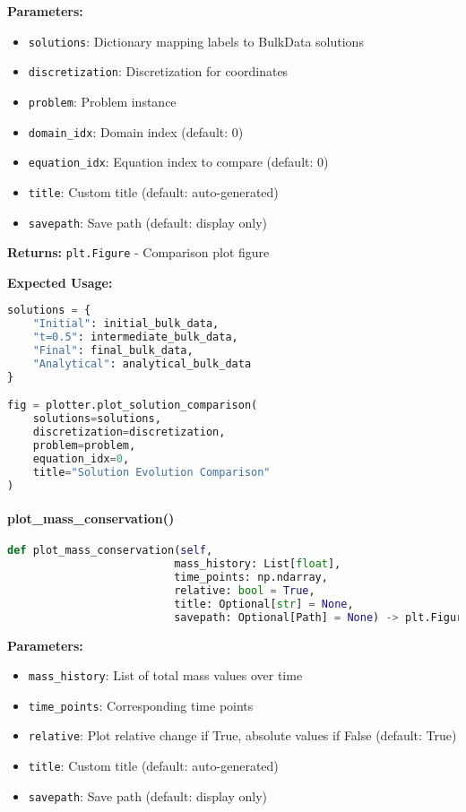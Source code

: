 \textbf{Parameters:}
\begin{itemize}
    \item \texttt{solutions}: Dictionary mapping labels to BulkData solutions
    \item \texttt{discretization}: Discretization for coordinates
    \item \texttt{problem}: Problem instance
    \item \texttt{domain\_idx}: Domain index (default: 0)
    \item \texttt{equation\_idx}: Equation index to compare (default: 0)
    \item \texttt{title}: Custom title (default: auto-generated)
    \item \texttt{savepath}: Save path (default: display only)
\end{itemize}

\textbf{Returns:} \texttt{plt.Figure} - Comparison plot figure

\textbf{Expected Usage:}
\begin{lstlisting}[language=Python, caption=Solution Comparison Usage]
solutions = {
    "Initial": initial_bulk_data,
    "t=0.5": intermediate_bulk_data,
    "Final": final_bulk_data,
    "Analytical": analytical_bulk_data
}

fig = plotter.plot_solution_comparison(
    solutions=solutions,
    discretization=discretization,
    problem=problem,
    equation_idx=0,
    title="Solution Evolution Comparison"
)
\end{lstlisting}

\paragraph{plot\_mass\_conservation()}\leavevmode
\begin{lstlisting}[language=Python, caption=Expected Mass Conservation Plotting Method]
def plot_mass_conservation(self,
                          mass_history: List[float],
                          time_points: np.ndarray,
                          relative: bool = True,
                          title: Optional[str] = None,
                          savepath: Optional[Path] = None) -> plt.Figure
\end{lstlisting}

\textbf{Parameters:}
\begin{itemize}
    \item \texttt{mass\_history}: List of total mass values over time
    \item \texttt{time\_points}: Corresponding time points
    \item \texttt{relative}: Plot relative change if True, absolute values if False (default: True)
    \item \texttt{title}: Custom title (default: auto-generated)
    \item \texttt{savepath}: Save path (default: display only)
\end{itemize}

